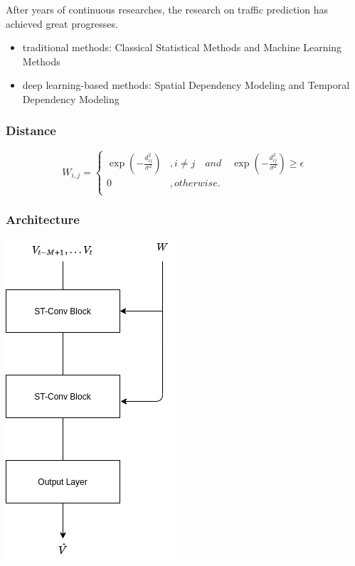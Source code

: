 \documentclass{beamer}
\begin{document}
\begin{frame}
  After years of continuous researches, the research on traffic prediction has achieved great progresses.
  \begin{itemize}
    \item traditional methods: Classical Statistical Methods and Machine Learning Methods
    \item deep learning-based methods: Spatial Dependency Modeling and Temporal Dependency Modeling
  \end{itemize}
\end{frame}
\begin{frame}
  \frametitle{Distance}
  \begin{equation}
    W_{i,j} = \left\{
      \begin{array}{ll}
        \exp(-\frac{d^{2}_{ij}}{\sigma^{2}}) & , i \neq j \quad and \quad \exp(-\frac{d^{2}_{ij}}{\sigma^{2}}) \geq \epsilon \\
        0 & , otherwise. \\
      \end{array}\right.
    \label{eq:distance}
  \end{equation}
\end{frame}
\begin{frame}
  \frametitle{Architecture}
  \centering
  \includegraphics[height=\textheight]{img/blocks.png}
\end{frame}
\end{document}
